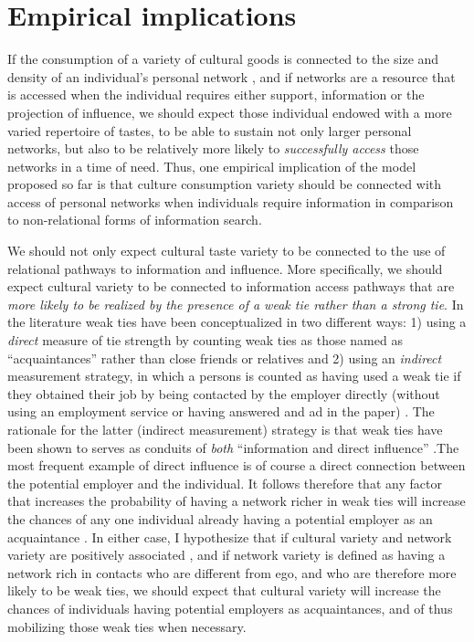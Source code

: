 \documentclass[12pt]{article}
\begin{document}
\section{Empirical implications}
If the consumption of a variety of cultural goods is connected to the size and density of an individual's personal network \citep{dimaggio87, lizardo06a}, and if networks are a resource that is accessed when the individual requires either support, information or the projection of influence, we should expect those individual endowed with a more varied repertoire of tastes, to be able to sustain not only larger personal networks, but also to be relatively more likely to \emph{successfully access} those networks in a time of need. Thus, one empirical implication of the model proposed so far is that culture consumption variety should be connected with access of personal networks when individuals require information in comparison to non-relational forms of information search.

We should not only expect cultural taste variety to be connected to the use of relational pathways to information and influence.  More specifically, we should expect cultural variety to be connected to information access pathways that are \emph{more likely to be realized by the presence of a weak tie rather than a strong tie}. In the literature weak ties have been conceptualized in two different ways: 1) using a \emph{direct} measure of tie strength by counting weak ties as those named as ``acquaintances'' rather than close friends or relatives \citep{granovetter95, mouw03} and 2) using an \emph{indirect} measurement strategy, in which a persons is counted as having used a weak tie if they obtained their job by being contacted by the employer directly (without using an employment service or having answered and ad in the paper) \citep{yakubovich05}.  The rationale for the latter  (indirect measurement) strategy is that weak ties have been shown to serves as conduits of \emph{both} ``information and direct influence'' \citep[415]{yakubovich05}.The most frequent example of direct influence is of course a direct connection between the potential employer and the individual. It follows therefore that any factor that increases the probability of having a network richer in weak ties will increase the chances of any one individual already having a potential employer as an acquaintance \citep{yakubovich05}.  In either case, I hypothesize that if cultural variety and network variety are positively associated \citep{lizardo06a, erickson96}, and if network variety is defined as having a network rich in contacts who are different from ego, and who are therefore more likely to be weak ties, we should expect that cultural variety will increase the chances of individuals having potential employers as acquaintances, and of thus mobilizing those weak ties when necessary. 
\end{document}
